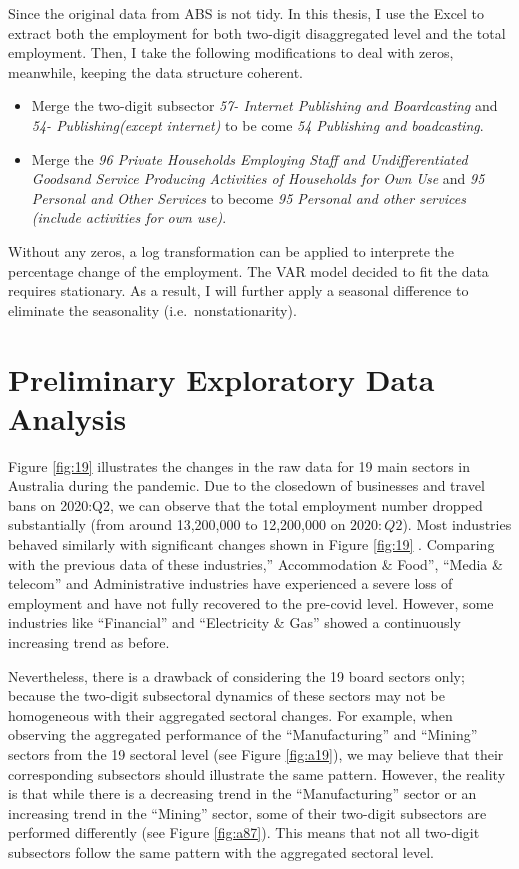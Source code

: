 \documentclass{monashthesis}
\begin{document}
Since the original data from ABS is not tidy. In this thesis, I use the Excel to extract both the employment for both two-digit disaggregated level and the total employment. Then, I take the following modifications to deal with zeros, meanwhile, keeping the data structure coherent.

\begin{itemize}
\item
  Merge the two-digit subsector \emph{57- Internet Publishing and Boardcasting} and \emph{54- Publishing(except internet)} to be come \emph{54 Publishing and boadcasting}.
\item
  Merge the \emph{96 Private Households Employing Staff and Undifferentiated Goodsand Service Producing Activities of Households for Own Use} and \emph{95 Personal and Other Services} to become \emph{95 Personal and other services (include activities for own use)}.
\end{itemize}

Without any zeros, a log transformation can be applied to interprete the percentage change of the employment. The VAR model decided to fit the data requires stationary. As a result, I will further apply a seasonal difference to eliminate the seasonality (i.e.~nonstationarity).

\hypertarget{preliminary-exploratory-data-analysis}{%
\section{Preliminary Exploratory Data Analysis}\label{preliminary-exploratory-data-analysis}}

Figure \ref{fig:19} illustrates the changes in the raw data for 19 main sectors in Australia during the pandemic. Due to the closedown of businesses and travel bans on 2020:Q2, we can observe that the total employment number dropped substantially (from around 13,200,000 to 12,200,000 on \(2020:Q2\)). Most industries behaved similarly with significant changes shown in Figure \ref{fig:19} . Comparing with the previous data of these industries,'' Accommodation \& Food'', ``Media \& telecom'' and Administrative industries have experienced a severe loss of employment and have not fully recovered to the pre-covid level. However, some industries like ``Financial'' and ``Electricity \& Gas'' showed a continuously increasing trend as before.

Nevertheless, there is a drawback of considering the 19 board sectors only; because the two-digit subsectoral dynamics of these sectors may not be homogeneous with their aggregated sectoral changes. For example, when observing the aggregated performance of the ``Manufacturing'' and ``Mining'' sectors from the 19 sectoral level (see Figure \ref{fig:a19}), we may believe that their corresponding subsectors should illustrate the same pattern. However, the reality is that while there is a decreasing trend in the ``Manufacturing'' sector or an increasing trend in the ``Mining'' sector, some of their two-digit subsectors are performed differently (see Figure \ref{fig:a87}). This means that not all two-digit subsectors follow the same pattern with the aggregated sectoral level.
\end{document}
